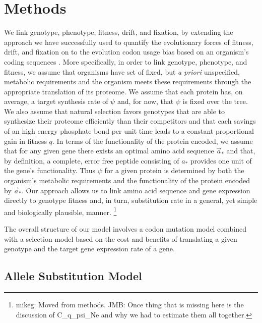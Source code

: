 \documentclass{article}
\newcommand{\aopt}{\ensuremath{a_*}\xspace}
\newcommand{\aoptvec}{\ensuremath{\Vec{a}_*}\xspace}
\begin{document}
\section*{Methods}\label{sec:methods}
We link genotype, phenotype, fitness, drift, and fixation, by extending the approach we have successfully used to quantify the evolutionary forces of fitness, drift, and fixation on to the evolution codon usage bias based on an organism's coding sequences \citep{GilchristAndWagner2006,Gilchrist2007,ShahAndGilchrist2011,GilchristEtAl2015}.
More specifically, in order to link genotype, phenotype, and fitness, we assume that organisms have set of fixed, but \emph{a priori} unspecified, metabolic requirements and the organism meets these requirements through the appropriate translation of its proteome.
We assume that each protein has, on average, a target synthesis rate of $\psi$ and, for now, that $\psi$ is fixed over the tree.
We also assume that natural selection favors genotypes that are able to synthesize their proteome efficiently than their competitors and that each savings of an high energy phosphate bond per unit time leads to a constant proportional gain in fitness $q$.
In terms of the functionality of the protein encoded, we assume that for any given gene there exists an optimal amino acid sequence \aoptvec and that, by definition, a complete, error free peptide consisting of \aopt provides one unit of the gene's functionality.
Thus $\psi$ for a given protein is determined by both the organism's metabolic requirements and the functionality of the protein encoded by \aoptvec.
Our approach allows us to link amino acid sequence and gene expression directly to genotype fitness and, in turn, substitution rate in a general, yet simple and biologically plausible, manner.
\footnote{mikeg: Moved from methods. JMB: Once thing that is missing here is the discussion of C_q_psi_Ne and why we had to estimate them all together.}

The overall structure of our model involves a codon mutation model combined with a selection model based on the cost and benefits of translating a given genotype and the target gene expression rate of a gene.

\subsection*{Allele Substitution Model}
\end{document}
